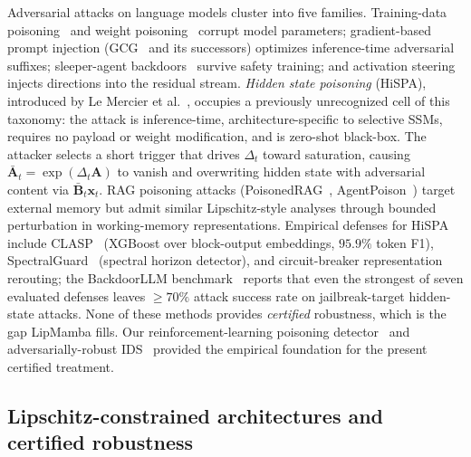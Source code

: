 \documentclass[12pt,a4paper]{article}
\theoremstyle{definition}
\theoremstyle{remark}
\newcommand{\modelname}{LipMamba}
\begin{document}
Adversarial attacks on language models cluster into five families. Training-data poisoning~\cite{gu2017badnets,chen2017targeted} and weight poisoning~\cite{kurita2020weight} corrupt model parameters; gradient-based prompt injection (GCG~\cite{zou2023universal} and its successors) optimizes inference-time adversarial suffixes; sleeper-agent backdoors~\cite{hubinger2024sleeper} survive safety training; and activation steering~\cite{zou2023repe,wang2024trojan} injects directions into the residual stream. \emph{Hidden state poisoning} (HiSPA), introduced by Le Mercier et al.~\cite{lemercier2026hispa}, occupies a previously unrecognized cell of this taxonomy: the attack is inference-time, architecture-specific to selective SSMs, requires no payload or weight modification, and is zero-shot black-box. The attacker selects a short trigger that drives $\Delta_t$ toward saturation, causing $\bar{\mathbf{A}}_t = \exp(\Delta_t \mathbf{A})$ to vanish and overwriting hidden state with adversarial content via $\bar{\mathbf{B}}_t \mathbf{x}_t$. RAG poisoning attacks (PoisonedRAG~\cite{zou2025poisonedrag}, AgentPoison~\cite{chen2024agentpoison}) target external memory but admit similar Lipschitz-style analyses through bounded perturbation in working-memory representations. Empirical defenses for HiSPA include CLASP~\cite{lemercier2026clasp} (XGBoost over block-output embeddings, $95.9\%$ token F1), SpectralGuard~\cite{lemercier2026spectralguard} (spectral horizon detector), and circuit-breaker representation rerouting; the BackdoorLLM benchmark~\cite{li2025backdoorllm} reports that even the strongest of seven evaluated defenses leaves $\geq 70\%$ attack success rate on jailbreak-target hidden-state attacks. None of these methods provides \emph{certified} robustness, which is the gap \modelname{} fills. Our reinforcement-learning poisoning detector~\cite{anaedevha2025dqn} and adversarially-robust IDS~\cite{anaedevha2024adversarial} provided the empirical foundation for the present certified treatment.

\subsection{Lipschitz-constrained architectures and certified robustness}
\end{document}
